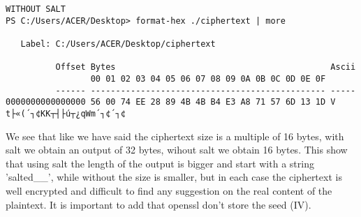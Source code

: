 \documentclass{article}
\begin{document}
\begin{lstlisting}[basicstyle=\tiny]
WITHOUT SALT
PS C:/Users/ACER/Desktop> format-hex ./ciphertext | more

   Label: C:/Users/ACER/Desktop/ciphertext

          Offset Bytes                                           Ascii
                 00 01 02 03 04 05 06 07 08 09 0A 0B 0C 0D 0E 0F
          ------ ----------------------------------------------- -----
0000000000000000 56 00 74 EE 28 89 4B 4B B4 E3 A8 71 57 6D 13 1D V t├«(´┐¢KK┬┤├ú┬¿qWm´┐¢´┐¢
\end{lstlisting}
We see that like we have said the ciphertext size is a multiple of 16 bytes, with salt we obtain an output of 32 bytes, wihout salt we obtain 16 bytes. This show that using salt the length of the output is bigger and start with a string 'salted\_\_', while without the size is smaller, but in each case the ciphertext is well encrypted and difficult to find any suggestion on the real content of the plaintext. It is important to add that openssl don't store the seed (IV).
\end{document}
